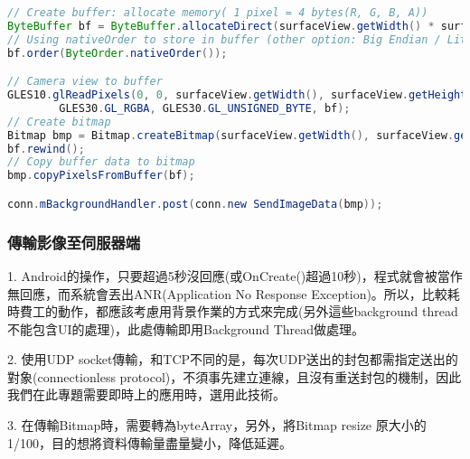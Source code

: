 \begin{lstlisting}[language=Java, caption=手機後相機影像擷取]
// Create buffer: allocate memory( 1 pixel = 4 bytes(R, G, B, A))
ByteBuffer bf = ByteBuffer.allocateDirect(surfaceView.getWidth() * surfaceView.getHeight() * 4);
// Using nativeOrder to store in buffer (other option: Big Endian / Little Endian)
bf.order(ByteOrder.nativeOrder());

// Camera view to buffer
GLES10.glReadPixels(0, 0, surfaceView.getWidth(), surfaceView.getHeight(),
        GLES30.GL_RGBA, GLES30.GL_UNSIGNED_BYTE, bf);
// Create bitmap
Bitmap bmp = Bitmap.createBitmap(surfaceView.getWidth(), surfaceView.getHeight(), Bitmap.Config.ARGB_8888);
bf.rewind();
// Copy buffer data to bitmap
bmp.copyPixelsFromBuffer(bf);

conn.mBackgroundHandler.post(conn.new SendImageData(bmp));
\end{lstlisting}

\subsubsection{傳輸影像至伺服器端}
1. Android的操作，只要超過5秒沒回應(或OnCreate()超過10秒)，程式就會被當作無回應，而系統會丟出ANR(Application No Response Exception)。所以，比較耗時費工的動作，都應該考慮用背景作業的方式來完成(另外這些background thread不能包含UI的處理)，此處傳輸即用Background Thread做處理。

2. 使用UDP socket傳輸，和TCP不同的是，每次UDP送出的封包都需指定送出的對象(connectionless protocol)，不須事先建立連線，且沒有重送封包的機制，因此我們在此專題需要即時上的應用時，選用此技術。

3. 在傳輸Bitmap時，需要轉為byteArray，另外，將Bitmap resize 原大小的1/100，目的想將資料傳輸量盡量變小，降低延遲。

